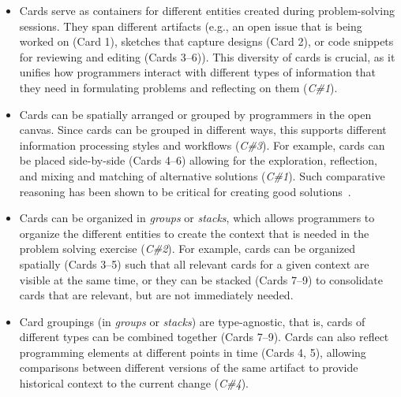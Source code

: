 \begin{itemize}
	\item Cards serve as containers for different entities created during problem-solving sessions. They span different artifacts (e.g., an open issue that is being worked on (Card 1), sketches that capture designs (Card 2), or code snippets for reviewing and editing (Cards 3--6)). This diversity of cards is crucial, as it unifies how programmers interact with different types of information that they need in formulating problems and reflecting on them (\textit{C\#1}).
    
	\item Cards can be spatially arranged or grouped by programmers in the open canvas. Since cards can be grouped in different ways, this supports different information processing styles and workflows (\textit{C\#3}). For example, cards can be placed side-by-side (Cards 4--6) allowing for the exploration, reflection, and mixing and matching of alternative solutions (\textit{C\#1}). Such comparative reasoning has been shown to be critical for creating good solutions~\cite{hartmann2008design}. 
 
	
	\item  Cards can be organized in \textit{groups} or \textit{stacks}, which allows programmers to organize the different entities to create the context that is needed in the problem solving exercise (\textit{C\#2}). For example, cards can be organized spatially (Cards 3--5) such that all relevant cards for a given context are visible at the same time, or they can be stacked (Cards 7–9) to consolidate cards that are relevant, but are not immediately needed.
	
	\item Card groupings (in \textit{groups} or \textit{stacks}) are type-agnostic, that is, cards of different types can be combined together (Cards 7--9). Cards can also reflect programming elements at different points in time (Cards 4, 5), allowing comparisons between different versions of the same artifact to provide historical context to the current change (\textit{C\#4}).
	

\end{itemize}
